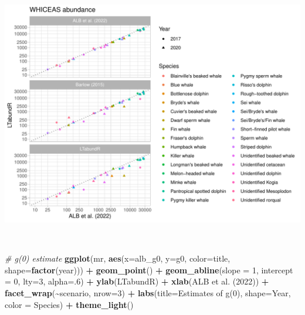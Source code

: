 \documentclass[
]{book}
\newenvironment{Shaded}{\begin{snugshade}}{\end{snugshade}}
\newcommand{\AttributeTok}[1]{\textcolor[rgb]{0.13,0.29,0.53}{#1}}
\newcommand{\CommentTok}[1]{\textcolor[rgb]{0.56,0.35,0.01}{\textit{#1}}}
\newcommand{\DecValTok}[1]{\textcolor[rgb]{0.00,0.00,0.81}{#1}}
\newcommand{\FunctionTok}[1]{\textcolor[rgb]{0.13,0.29,0.53}{\textbf{#1}}}
\newcommand{\NormalTok}[1]{#1}
\newcommand{\SpecialCharTok}[1]{\textcolor[rgb]{0.81,0.36,0.00}{\textbf{#1}}}
\newcommand{\StringTok}[1]{\textcolor[rgb]{0.31,0.60,0.02}{#1}}
\begin{document}
\includegraphics{figures/unnamed-chunk-387-1.pdf}

~

\begin{Shaded}
\begin{Highlighting}[]
\CommentTok{\# g(0) estimate}
\FunctionTok{ggplot}\NormalTok{(mr,}
       \FunctionTok{aes}\NormalTok{(}\AttributeTok{x=}\NormalTok{alb\_g0, }\AttributeTok{y=}\NormalTok{g0, }
           \AttributeTok{color=}\NormalTok{title, }\AttributeTok{shape=}\FunctionTok{factor}\NormalTok{(year))) }\SpecialCharTok{+}
    \FunctionTok{geom\_point}\NormalTok{() }\SpecialCharTok{+}
    \FunctionTok{geom\_abline}\NormalTok{(}\AttributeTok{slope =} \DecValTok{1}\NormalTok{, }\AttributeTok{intercept =} \DecValTok{0}\NormalTok{, }\AttributeTok{lty=}\DecValTok{3}\NormalTok{, }\AttributeTok{alpha=}\NormalTok{.}\DecValTok{6}\NormalTok{) }\SpecialCharTok{+}
    \FunctionTok{ylab}\NormalTok{(}\StringTok{\textquotesingle{}LTabundR\textquotesingle{}}\NormalTok{) }\SpecialCharTok{+} \FunctionTok{xlab}\NormalTok{(}\StringTok{\textquotesingle{}ALB et al. (2022)\textquotesingle{}}\NormalTok{) }\SpecialCharTok{+}
  \FunctionTok{facet\_wrap}\NormalTok{(}\SpecialCharTok{\textasciitilde{}}\NormalTok{scenario, }\AttributeTok{nrow=}\DecValTok{3}\NormalTok{) }\SpecialCharTok{+} 
  \FunctionTok{labs}\NormalTok{(}\AttributeTok{title=}\StringTok{\textquotesingle{}Estimates of g(0)\textquotesingle{}}\NormalTok{, }
       \AttributeTok{shape=}\StringTok{\textquotesingle{}Year\textquotesingle{}}\NormalTok{, }\AttributeTok{color =} \StringTok{\textquotesingle{}Species\textquotesingle{}}\NormalTok{) }\SpecialCharTok{+} 
  \FunctionTok{theme\_light}\NormalTok{()}
\end{Highlighting}
\end{Shaded}
\end{document}
